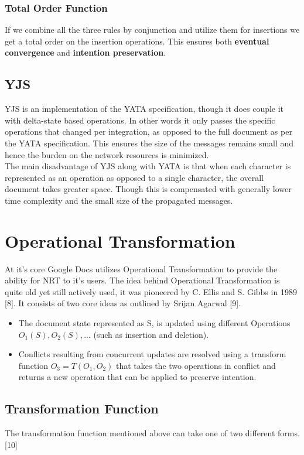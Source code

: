 \documentclass[9pt, titlepage]{article}
\begin{document}
  \subsubsection{Total Order Function}
  If we combine all the three rules by conjunction and utilize them for insertions we get a total order on the insertion operations.
  This ensures both \textbf{eventual convergence} and \textbf{intention preservation}.

  \subsection{YJS}
  YJS is an implementation of the YATA specification, though it does couple it with delta-state based operations.
  In other words it only passes the specific operations that changed per integration, as opposed to the full document as per the YATA specification.
  This ensures the size of the messages remains small and hence the burden on the network resources is minimized.\\
  The main disadvantage of YJS along with YATA is that when each character is represented as an operation as opposed to a single character, the overall document takes greater space.
  Though this is compensated with generally lower time complexity and the small size of the propagated messages.

  \section{Operational Transformation}
  At it's core Google Docs utilizes Operational Transformation to provide the ability for NRT to it's users. 
  The idea behind Operational Transformation is quite old yet still actively used, it was pioneered by  C. Ellis and S. Gibbs in 1989 [8].
  It consists of two core ideas as outlined by Srijan Agarwal [9].

  \begin{itemize}
    \item The document state represented as S, is updated using different Operations \(O_{1}(S), O_{2}(S), ...\) (such as insertion and deletion).
    \item Conflicts resulting from concurrent updates are resolved using a transform function \(O_{3} = T(O_{1}, O_{2})\) that takes the two operations in conflict and returns a new operation that can be applied to preserve intention. 
  \end{itemize}

  \subsection{Transformation Function}
  The transformation function mentioned above can take one of two different forms. [10]
\end{document}

